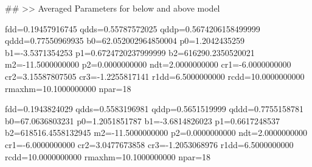 \documentclass[11pt]{article}
\begin{document}
\#\#
>> Averaged Parameters for below and above model 

fdd=0.19457916745 qdds=0.55787572025 qddp=0.5674206158499999
qddd=0.77550969935 b0=62.052002964850004 p0=1.2042435259 b1=-3.5371354253
p1=0.6724720237999999 b2=616290.2350520021 m2=-11.5000000000 p2=0.0000000000
ndt=2.0000000000 cr1=-6.0000000000 cr2=3.15587807505 cr3=-1.2255817141
r1dd=6.5000000000 rcdd=10.0000000000 rmaxhm=10.1000000000 npar=18 







fdd=0.1943824029 qdds=0.5583196981 qddp=0.5651519999 qddd=0.7755158781 b0=67.0636803231 p0=1.2051851787 b1=-3.6814826023 p1=0.6617248537 b2=618516.4558132945 m2=-11.5000000000 p2=0.0000000000 ndt=2.0000000000 cr1=-6.0000000000 cr2=3.0477673858 cr3=-1.2053068976 r1dd=6.5000000000 rcdd=10.0000000000 rmaxhm=10.1000000000 npar=18 
\end{document}
